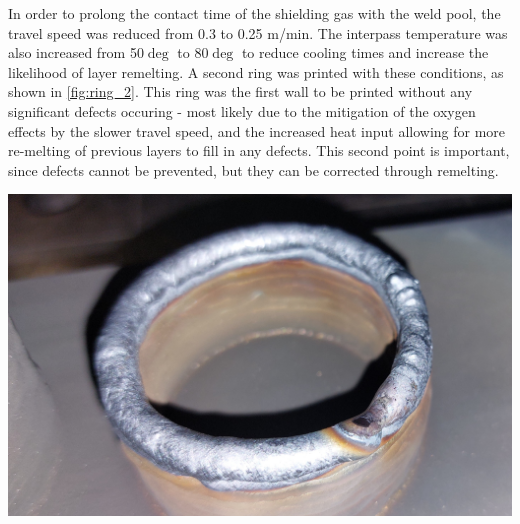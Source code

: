 In order to prolong the contact time of the shielding gas with the weld pool, the travel speed was reduced from 0.3 to 0.25 m/min. The interpass temperature was also increased from 50$\deg$ to 80$\deg$ to reduce cooling times and increase the likelihood of layer remelting. A second ring was printed with these conditions, as shown in \autoref{fig:ring_2}.
This ring was the first wall to be printed without any significant defects occuring - most likely due to the mitigation of the oxygen effects by the slower travel speed, and the increased heat input allowing for more re-melting of previous layers to fill in any defects. This second point is important, since defects cannot be prevented, but they can be corrected through remelting.

\begin{minipage}{\linewidth}
    \centering
    \includegraphics[width=\linewidth]{images/ring_2.jpg}
    \label{fig:ring_2}
\end{minipage}
